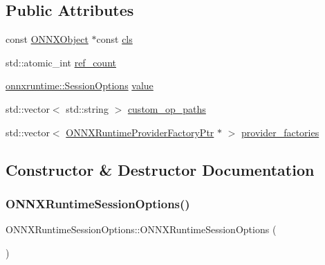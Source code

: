 \subsection*{Public Attributes}
\begin{DoxyCompactItemize}
\item 
const \mbox{\hyperlink{structONNXObject}{O\+N\+N\+X\+Object}} $\ast$const \mbox{\hyperlink{structONNXRuntimeSessionOptions_a2256c57bdcd75cc4026b70d93f6a1647}{cls}}
\item 
std\+::atomic\+\_\+int \mbox{\hyperlink{structONNXRuntimeSessionOptions_a7b75fb8af22d1bab4d3b78d560e59a99}{ref\+\_\+count}}
\item 
\mbox{\hyperlink{structonnxruntime_1_1SessionOptions}{onnxruntime\+::\+Session\+Options}} \mbox{\hyperlink{structONNXRuntimeSessionOptions_a5e7a9bf1617d454a8fc7859c6bb2bf0c}{value}}
\item 
std\+::vector$<$ std\+::string $>$ \mbox{\hyperlink{structONNXRuntimeSessionOptions_adf2105ca082aa375f8d26ff486c0c750}{custom\+\_\+op\+\_\+paths}}
\item 
std\+::vector$<$ \mbox{\hyperlink{session__options__c__api_8h_a351bab8a857e0f355c92af5c22b759bc}{O\+N\+N\+X\+Runtime\+Provider\+Factory\+Ptr}} $\ast$ $>$ \mbox{\hyperlink{structONNXRuntimeSessionOptions_a967237e6f05ce2a84ac42f4cb8f61f7b}{provider\+\_\+factories}}
\end{DoxyCompactItemize}


\subsection{Constructor \& Destructor Documentation}
\mbox{\label{structONNXRuntimeSessionOptions_a637c3e62320545025e31565cfc2a9884}} 
\subsubsection{\texorpdfstring{O\+N\+N\+X\+Runtime\+Session\+Options()}{ONNXRuntimeSessionOptions()}\hspace{0.1cm}{\footnotesize\ttfamily [1/2]}}
{\footnotesize\ttfamily O\+N\+N\+X\+Runtime\+Session\+Options\+::\+O\+N\+N\+X\+Runtime\+Session\+Options (\begin{DoxyParamCaption}{ }\end{DoxyParamCaption})}

